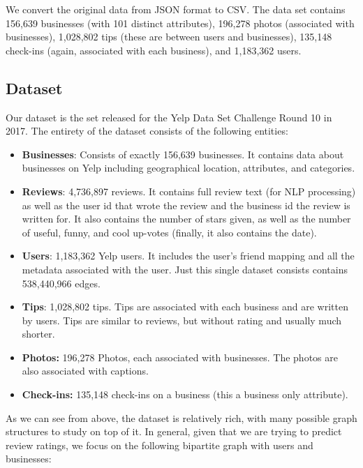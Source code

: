 \documentclass[letterpaper, 10 pt, conference]{ieeeconf}  %
\begin{document}
We convert the original data from JSON format to CSV. The data set contains 156,639 businesses (with 101 distinct attributes), 196,278 photos (associated with businesses), 1,028,802 tips (these are between users and businesses), 135,148 check-ins (again, associated with each business), and 1,183,362 users.

\subsection{Dataset}
Our dataset is the set released for the Yelp Data Set Challenge Round 10 \cite{YelpDataSet} in 2017. The entirety of the dataset consists of the following entities:
\begin{itemize}
\item \textbf{Businesses}: Consists of exactly 156,639 businesses. It contains data about businesses on Yelp including geographical location, attributes, and categories.
\item \textbf{Reviews}: 4,736,897 reviews. It contains full review text (for NLP processing) as well as the user id that wrote the review and the business id the review is written for. It also contains the number of stars given, as well as the number of useful, funny, and cool up-votes (finally, it also contains the date).
\item \textbf{Users}: 1,183,362 Yelp users. It includes the user's friend mapping and all the metadata associated with the user. Just this single dataset consists contains 538,440,966 edges.
\item \textbf{Tips}: 1,028,802 tips. Tips are associated with each business and are written by users. Tips are similar to reviews, but without rating and usually much shorter.
\item \textbf{Photos:} 196,278 Photos, each associated with businesses. The photos are also associated with captions.
\item \textbf{Check-ins:} 135,148 check-ins on a business (this a business only attribute).
\end{itemize}

As we can see from above, the dataset is relatively rich, with many possible graph structures to study on top of it. In general, given that we are trying to predict review ratings, we focus on the following bipartite graph with users and businesses:
\end{document}
